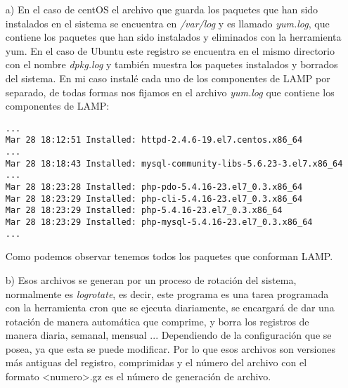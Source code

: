 \documentclass[a4paper, 10pt]{article} %
\begin{document}
\begin{itemize}
\item[a)]En el caso de centOS el archivo que guarda los paquetes que han sido instalados en el sistema se encuentra en \textit{/var/log} y es llamado \textit{yum.log}, que contiene los paquetes que han sido instalados y eliminados con la herramienta yum. En el caso de Ubuntu este registro se encuentra en el mismo directorio con el nombre \textit{dpkg.log} y también muestra los paquetes instalados y borrados del sistema. En mi caso instalé cada uno de los componentes de LAMP por separado, de todas formas nos fijamos en el archivo \textit{yum.log} que contiene los componentes de LAMP:
\begin{verbatim}
...
Mar 28 18:12:51 Installed: httpd-2.4.6-19.el7.centos.x86_64 
...
Mar 28 18:18:43 Installed: mysql-community-libs-5.6.23-3.el7.x86_64 
...
Mar 28 18:23:28 Installed: php-pdo-5.4.16-23.el7_0.3.x86_64 
Mar 28 18:23:29 Installed: php-cli-5.4.16-23.el7_0.3.x86_64 
Mar 28 18:23:29 Installed: php-5.4.16-23.el7_0.3.x86_64 
Mar 28 18:23:29 Installed: php-mysql-5.4.16-23.el7_0.3.x86_64 
...
\end{verbatim}
Como podemos observar tenemos todos los paquetes que conforman LAMP.
\item[b)] \cite{1} Esos archivos se generan por un proceso de rotación del sistema, normalmente es \textit{logrotate}, es decir, este programa es una tarea programada con la herramienta cron que se ejecuta diariamente, se encargará de dar una rotación de manera automática que comprime, y borra los registros de manera diaria, semanal, mensual ... Dependiendo de la configuración que se posea, ya que esta se puede modificar. Por lo que esos archivos son versiones más antiguas del registro, comprimidas y el número del archivo con el formato <numero>.gz es el número de generación de archivo.
\end{itemize}
\end{document}
